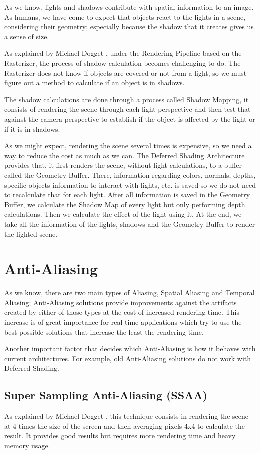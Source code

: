 \documentclass{cslthse-msc}
\begin{document}
As we know, lights and shadows contribute with spatial information to an image. As humans, we have come to expect that objects react to the lights in a scene, considering their geometry; especially because the shadow that it creates gives us a sense of size.

As explained by Michael Dogget \cite{Doggett2017EDAN35}, under the Rendering Pipeline based on the Rasterizer, the process of shadow calculation becomes challenging to do. The Rasterizer does not know if objects are covered or not from a light, so we must figure out a method to calculate if an object is in shadows. 

The shadow calculations are done through a process called Shadow Mapping, it consists of rendering the scene through each light perspective and then test that against the camera perspective to establish if the object is affected by the light or if it is in shadows.

As we might expect, rendering the scene several times is expensive, so we need a way to reduce the cost as much as we can. The Deferred Shading Architecture provides that, it first renders the scene, without light calculations, to a buffer called the Geometry Buffer. There, information regarding colors, normals, depths, specific objects information to interact with lights, etc. is saved so we do not need to recalculate that for each light. After all information is saved in the Geometry Buffer, we calculate the Shadow Map of every light but only performing depth calculations. Then we calculate the effect of the light using it. At the end, we take all the information of the lights, shadows and the Geometry Buffer to render the lighted scene.


\section{Anti-Aliasing}
As we know, there are two main types of Aliasing, Spatial Aliasing and Temporal Aliasing; Anti-Aliasing solutions provide improvements against the artifacts created by either of those types at the cost of increased rendering time. This increase is of great importance for real-time applications which try to use the best possible solutions that increase the least the rendering time. 

Another important factor that decides which Anti-Aliasing is how it behaves with current architectures. For example, old Anti-Aliasing solutions do not work with Deferred Shading.

\subsection{Super Sampling Anti-Aliasing (SSAA)}
As explained by Michael Dogget \cite{Doggett2017EDAN35}, this technique consists in rendering the scene at 4 times the size of the screen and then averaging pixels 4x4 to calculate the result. It provides good results but requires more rendering time and heavy memory usage.
\end{document}
